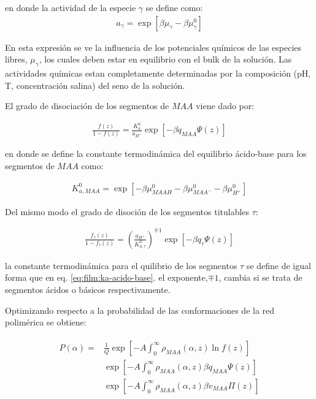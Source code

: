 \noindent en donde la actividad de la especie $\gamma$ se define como:
\begin{align}
	a_\gamma = \exp[\beta\mu_\gamma - \beta\mu^0_\gamma]
\end{align}

En esta expresi\'on se ve la influencia de los potenciales qu\'imicos de las especies libres,  $\mu_\gamma$, los cuales  deben estar en equilibrio con el bulk de la soluci\'on. Las actividades qu\'imicas estan completamente determinadas por la composici\'on (pH, T, concentraci\'on salina) del seno de la soluci\'on.
 
El grado de disociaci\'on de los segmentos de $MAA$ viene dado por:

\begin{align}
	\frac{f(z)}{1-f(z)} = \frac{K^0_a}{a_{H^+}} \exp[-\beta q_{MAA}\Psi(z)]
	\label{eq:film:degree-film}
\end{align}

\noindent en donde se define la constante termodin\'amica del equilibrio \'acido-base para los segmentos de $MAA$ como:

\begin{align}
	K_{a,MAA}^0 = \exp[-\beta\mu^0_{MAAH} -\beta\mu^0_{MAA^-} -\beta\mu^0_{H^+}]
	\label{eq:film:ka-acido-base}
\end{align}

Del mismo modo el grado de disoci\'on de los segmentos titulables $\tau$:

\begin{align}
	\frac{f_\tau(z)}{1-f_\tau(z)} = \left(\frac{a_{H^+}}{K^0_{a,\tau}}\right)^{\mp 1} \exp[-\beta q_\tau \Psi(z)]
	\label{eq:film:degree-protein}
\end{align}


\noindent la constante termodin\'amica para el quilibrio de los segmentos $\tau$ se define de igual forma que en eq. \ref{eq:film:ka-acido-base}. el exponente,$\mp 1$, cambia si se trata de segmentos \'acidos o b\'asicos respectivamente.

Optimizando respecto a la probabilidad de las conformaciones de la red polim\'erica se obtiene:

\begin{align}
	\begin{aligned}
	P(\alpha) = &\frac{1}{Q}\exp\left[ -A \int^\infty_0 \rho_{MAA}(\alpha, z) \ln f(z)\right] \\
	&\exp\left[ -A \int^\infty_0 \rho_{MAA}(\alpha, z) \beta q_{MAA} \Psi(z)\right] \\
	& \exp\left[ -A \int^\infty_0 \rho_{MAA}(\alpha, z) \beta v_{MAA} \Pi(z)\right] 
	\end{aligned}
	\label{eq:film:probabilidad}
\end{align}

